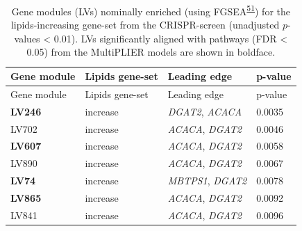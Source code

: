 \documentclass[
  a4paper,
]{article}
\newenvironment{tablenos:tagged-table}[1][]{
  \let\oldtablename\tablename
  \renewcommand{\tablename}{Supplementary Table}
}{
  \let\tablename\oldtablename
}
\begin{document}
\begin{tablenos:tagged-table}[S1]

\begin{longtable}[]{@{}llll@{}}
\caption{Gene modules (LVs) nominally enriched (using FGSEA\textsuperscript{\protect\hyperlink{ref-Z8WXLD67}{51}}) for the lipids-increasing gene-set from the CRISPR-screen (unadjusted \(p\)-values \textless{} 0.01).
LVs significantly aligned with pathways (FDR \textless{} 0.05) from the MultiPLIER models are shown in boldface.
\label{tbl:sup:lipids_crispr:modules_enriched_increase}}\label{tbl:sup:lipids_crispr:modules_enriched_increase}\tabularnewline
\toprule()
Gene module & Lipids gene-set & Leading edge & p-value \\
\midrule()
\endfirsthead
\toprule()
Gene module & Lipids gene-set & Leading edge & p-value \\
\midrule()
\endhead
\textbf{LV246} & increase & \emph{DGAT2}, \emph{ACACA} & 0.0035 \\
LV702 & increase & \emph{ACACA}, \emph{DGAT2} & 0.0046 \\
\textbf{LV607} & increase & \emph{ACACA}, \emph{DGAT2} & 0.0058 \\
LV890 & increase & \emph{ACACA}, \emph{DGAT2} & 0.0067 \\
\textbf{LV74} & increase & \emph{MBTPS1}, \emph{DGAT2} & 0.0078 \\
\textbf{LV865} & increase & \emph{ACACA}, \emph{DGAT2} & 0.0092 \\
LV841 & increase & \emph{ACACA}, \emph{DGAT2} & 0.0096 \\
\bottomrule()
\end{longtable}

\end{tablenos:tagged-table}
\end{document}

